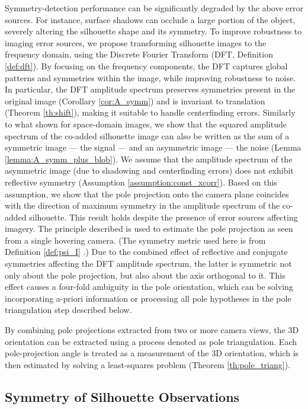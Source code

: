 Symmetry-detection performance can be significantly degraded by the above error sources. For instance, surface shadows can occlude a large portion of the object, severely altering the silhouette shape and its symmetry. To improve robustness to imaging error sources, we propose transforming silhouette images to the frequency domain, using the Discrete Fourier Transform (DFT, Definition \ref{def:dft}). By focusing on the frequency components,  the DFT captures global patterns and symmetries within the image, while improving robustness to noise. In particular, the DFT amplitude spectrum preserves symmetries present in the original image (Corollary \ref{cor:A_symm}) and is invariant to translation (Theorem \ref{th:shift}), making it suitable to handle centerfinding errors. Similarly to what shown for space-domain images, we show that the squared amplitude spectrum of the co-added silhouette image can also be written as the sum of a symmetric image --- the signal --- and an asymmetric image --- the noise (Lemma \ref{lemma:A_symm_plus_blob}). We assume that the amplitude spectrum of the asymmetric image (due to shadowing and centerfinding errors) does not exhibit reflective symmetry (Assumption \ref{assumption:const_xcorr}). Based on this assumption, we show that the pole projection onto the camera plane coincides with the direction of maximum symmetry in the amplitude spectrum of the co-added silhouette. This result holds despite the presence of error sources affecting imagery. The principle described is used to estimate the pole projection as seen from a single hovering camera. (The symmetry metric used here is from Definition \ref{def:psi_I} .) Due to the combined effect of reflective and conjugate symmetries affecting the DFT amplitude spectrum, the latter is symmetric not only about the pole projection, but also about the axis orthogonal to it. This effect causes a four-fold ambiguity in the pole orientation, which can be solving incorporating a-priori information or processing all pole hypotheses in the pole triangulation step described below.

By combining pole projections extracted from two or more camera views, the 3D orientation can be extracted using a process denoted as pole triangulation. Each pole-projection angle is treated as a measurement of the 3D orientation, which is then estimated by solving a least-squares problem (Theorem \ref{th:pole_triang}).

\subsection{Symmetry of Silhouette Observations}
\label{sec:perfect_silh}

